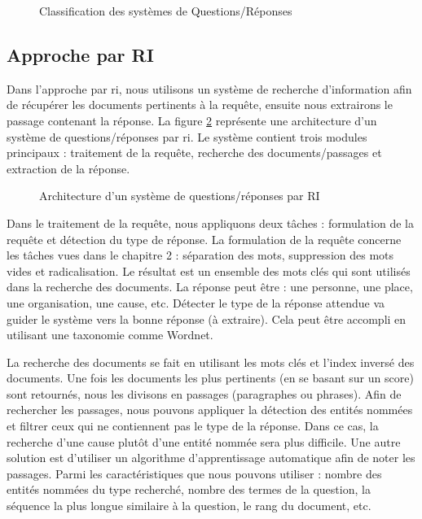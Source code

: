 \documentclass{KodeBook}
\begin{document}
\begin{figure}[!ht]
	\centering
	\caption{Classification des systèmes de Questions/Réponses}
	\label{fig:qr-classif}
\end{figure}

\subsection{Approche par RI}

Dans l'approche par \ac{ri}, nous utilisons un système de recherche d'information afin de récupérer les documents pertinents à la requête, ensuite nous extrairons le passage contenant la réponse.
La figure \ref{fig:qa-ri} représente une architecture d'un système de questions/réponses par \ac{ri}. 
Le système contient trois modules principaux : traitement de la requête, recherche des documents/passages et extraction de la réponse. 

\begin{figure}[!ht]
	\centering
	\caption[Architecture d'un système de questions/réponses par RI]{Architecture d'un système de questions/réponses par RI \cite{2019-jurafsky-martin}}
	\label{fig:qa-ri}
\end{figure}

Dans le traitement de la requête, nous appliquons deux tâches : formulation de la requête et détection du type de réponse. 
La formulation de la requête concerne les tâches vues dans le chapitre 2 : séparation des mots, suppression des mots vides et radicalisation. 
Le résultat est un ensemble des mots clés qui sont utilisés dans la recherche des documents. 
La réponse peut être : une personne, une place, une organisation, une cause, etc. 
Détecter le type de la réponse attendue va guider le système vers la bonne réponse (à extraire). 
Cela peut être accompli en utilisant une taxonomie comme Wordnet.

La recherche des documents se fait en utilisant les mots clés et l'index inversé des documents. 
Une fois les documents les plus pertinents (en se basant sur un score) sont retournés, nous les divisons en passages (paragraphes ou phrases). 
Afin de rechercher les passages, nous pouvons appliquer la détection des entités nommées et filtrer ceux qui ne contiennent pas le type de la réponse.
Dans ce cas, la recherche d'une cause plutôt d'une entité nommée sera plus difficile. 
Une autre solution est d'utiliser un algorithme d'apprentissage automatique afin de noter les passages. 
Parmi les caractéristiques que nous pouvons utiliser : nombre des entités nommées du type recherché, nombre des termes de la question, la séquence la plus longue similaire à la question, le rang du document, etc.
\end{document}

